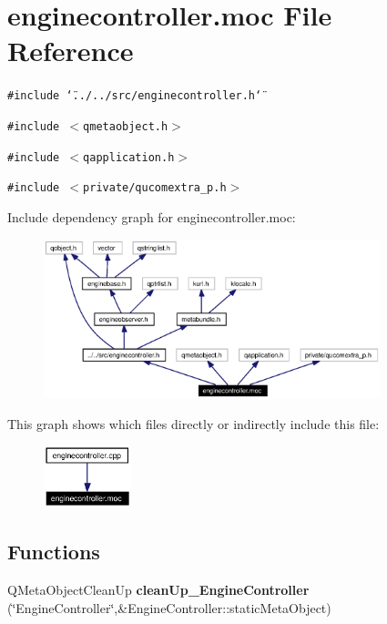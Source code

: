 \section{enginecontroller.moc File Reference}
\label{enginecontroller_8moc}


{\tt \#include \char`\"{}../../src/enginecontroller.h\char`\"{}}\par
{\tt \#include $<$qmetaobject.h$>$}\par
{\tt \#include $<$qapplication.h$>$}\par
{\tt \#include $<$private/qucomextra\_\-p.h$>$}\par


Include dependency graph for enginecontroller.moc:\begin{figure}[H]
\begin{center}
\leavevmode
\includegraphics[width=277pt]{enginecontroller_8moc__incl}
\end{center}
\end{figure}


This graph shows which files directly or indirectly include this file:\begin{figure}[H]
\begin{center}
\leavevmode
\includegraphics[width=72pt]{enginecontroller_8moc__dep__incl}
\end{center}
\end{figure}
\subsection*{Functions}
\begin{CompactItemize}
\item 
QMeta\-Object\-Clean\-Up {\bf clean\-Up\_\-Engine\-Controller} (\char`\"{}Engine\-Controller\char`\"{},\&Engine\-Controller::static\-Meta\-Object)
\end{CompactItemize}


